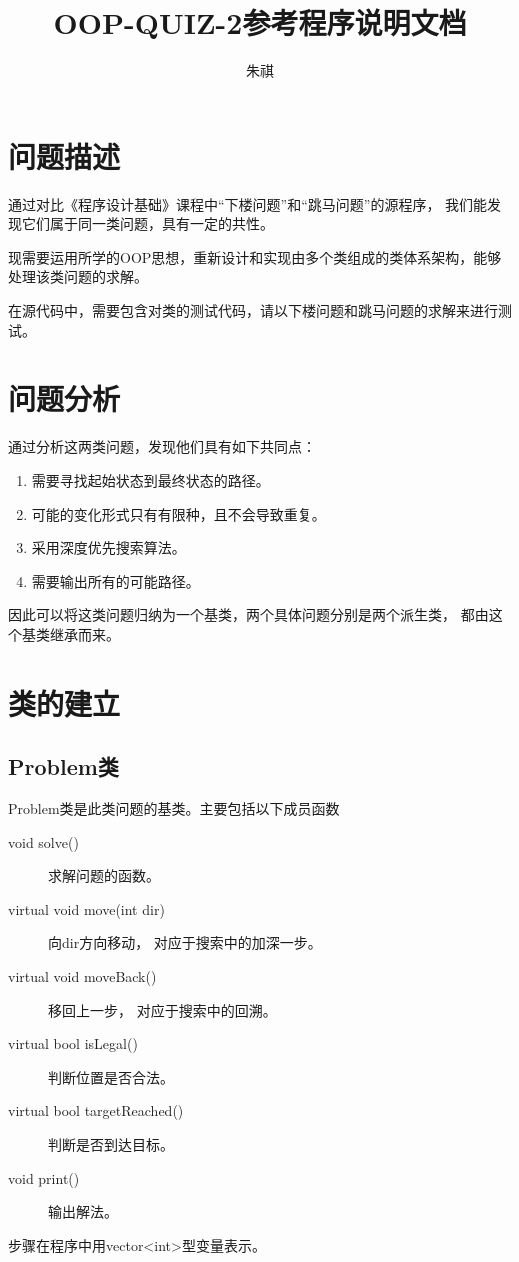 \documentclass{article}
\title{OOP-QUIZ-2参考程序说明文档}
\author{朱祺}
\begin{document}
\maketitle
\section{问题描述}
通过对比《程序设计基础》课程中“下楼问题”和“跳马问题”的源程序，
我们能发现它们属于同一类问题，具有一定的共性。

现需要运用所学的OOP思想，重新设计和实现由多个类组成的类体系架构，能够处理该类问题的求解。

在源代码中，需要包含对类的测试代码，请以下楼问题和跳马问题的求解来进行测试。

\section{问题分析}

通过分析这两类问题，发现他们具有如下共同点：

\begin{enumerate}
	\item 需要寻找起始状态到最终状态的路径。
	\item 可能的变化形式只有有限种，且不会导致重复。
	\item 采用深度优先搜索算法。
	\item 需要输出所有的可能路径。
	

\end {enumerate}
因此可以将这类问题归纳为一个基类，两个具体问题分别是两个派生类，
都由这个基类继承而来。
\section{类的建立}
\subsection{Problem类}

Problem类是此类问题的基类。主要包括以下成员函数
\begin{description}
	\item[void solve()] 求解问题的函数。
	\item[virtual void move(int dir)] 向dir方向移动，
		对应于搜索中的加深一步。
	\item[virtual void moveBack()] 移回上一步，
		对应于搜索中的回溯。
	\item[virtual bool isLegal()] 判断位置是否合法。
	\item[virtual bool targetReached()] 判断是否到达目标。
	\item[void print()] 输出解法。
\end {description}
步骤在程序中用vector<int>型变量表示。
\end{document}
